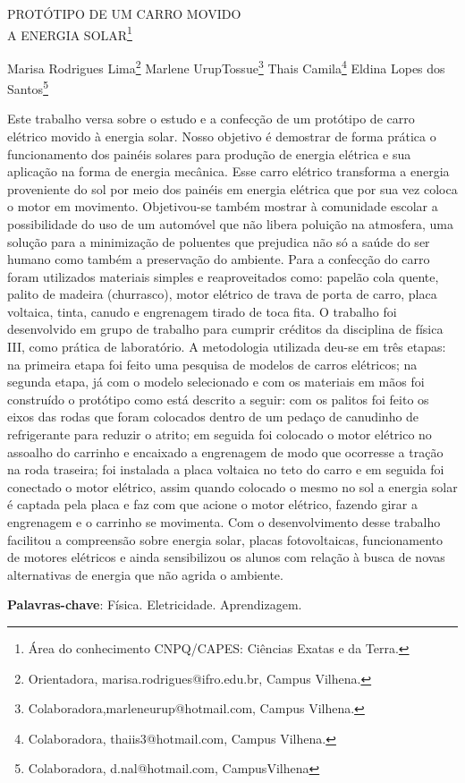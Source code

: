 \documentclass[article,12pt,onesidea,4paper,english,brazil]{abntex2}
\begin{document}
	
	
	\frenchspacing 
	
	\begin{center}
		\LARGE PROTÓTIPO DE UM CARRO MOVIDO\\A ENERGIA SOLAR\footnote{Área do conhecimento CNPQ/CAPES: Ciências Exatas e da Terra.}
		
		\normalsize
		Marisa Rodrigues Lima\footnote{Orientadora, marisa.rodrigues@ifro.edu.br, Campus Vilhena.} 
		Marlene UrupTossue\footnote{Colaboradora,marleneurup@hotmail.com, Campus Vilhena.} 
		Thais Camila\footnote{Colaboradora, thaiis3@hotmail.com, Campus Vilhena.} 
		Eldina Lopes dos Santos\footnote{Colaboradora, d.nal@hotmail.com, CampusVilhena} 
	\end{center}
	
	\noindent Este trabalho versa sobre o estudo e a confecção de um protótipo de carro elétrico movido à energia solar. Nosso objetivo é demostrar de forma prática o funcionamento dos painéis solares para produção de energia elétrica e sua aplicação na forma de energia mecânica. Esse carro elétrico transforma a energia proveniente do sol por meio dos painéis em energia elétrica que por sua vez coloca o motor em movimento. Objetivou-se também mostrar à comunidade escolar a possibilidade do uso de um automóvel que não libera poluição na atmosfera, uma solução para a minimização de poluentes que prejudica não só a saúde do ser humano como também a preservação do ambiente. Para a confecção do carro foram utilizados materiais simples e reaproveitados como: papelão cola quente, palito de madeira (churrasco), motor elétrico de trava de porta de carro, placa voltaica, tinta, canudo e engrenagem tirado de toca fita. O trabalho foi desenvolvido em grupo de trabalho para cumprir créditos da disciplina de física III, como prática de laboratório. A metodologia utilizada deu-se em três etapas: na primeira etapa foi feito uma pesquisa de modelos de carros elétricos; na segunda etapa, já com o modelo selecionado e com os materiais em mãos foi construído o protótipo como está descrito a seguir: com os palitos foi feito os eixos das rodas que foram colocados dentro de um pedaço de canudinho de refrigerante para reduzir o atrito; em seguida foi colocado o motor elétrico no assoalho do carrinho e encaixado a engrenagem de modo que ocorresse a tração na roda traseira; foi instalada a placa voltaica no teto do carro e em seguida foi conectado o motor elétrico, assim quando colocado o mesmo no sol a energia solar é captada pela placa e faz com que acione o motor elétrico, fazendo girar a engrenagem e o carrinho se movimenta. Com o desenvolvimento desse trabalho facilitou a compreensão sobre energia solar, placas fotovoltaicas, funcionamento de motores elétricos e ainda sensibilizou os alunos com relação à busca de novas alternativas de energia que não agrida o ambiente.
	
	\vspace{\onelineskip}
	
	\noindent
	\textbf{Palavras-chave}: Física. Eletricidade. Aprendizagem.
	
\end{document}
